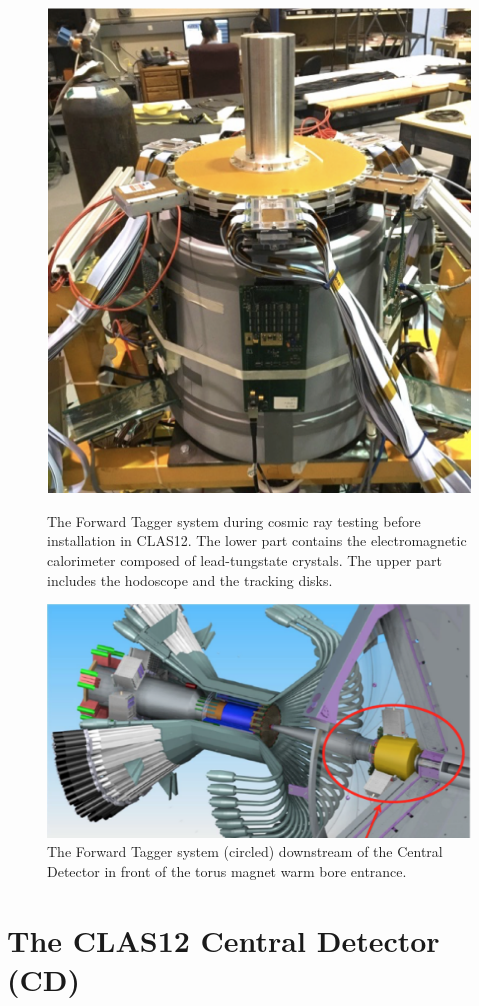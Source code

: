 \documentclass[final,3p,twocolumn]{elsarticle}
\begin{document}
\begin{figure}[t!]
\centerline{\includegraphics[width=0.70\columnwidth]{FT-photo.png}}
\caption{The Forward Tagger system during cosmic ray testing before installation in CLAS12. The lower part contains
the electromagnetic calorimeter composed of lead-tungstate crystals. The upper part includes the hodoscope and the
tracking disks.}
\label{ft-photo}
\vspace{1cm}\centerline{\includegraphics[width=1.0\columnwidth]{CD-FT.png}}
\caption{The Forward Tagger system (circled) downstream of the Central Detector in front of the torus magnet
  warm bore entrance.}
\label{ft}
\end{figure}

\section{The CLAS12 Central Detector (CD)}
\end{document}
